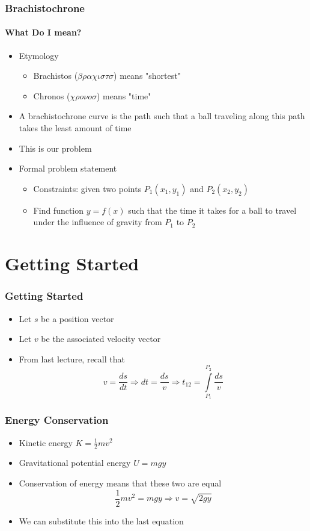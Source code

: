 \documentclass[12pt]{beamer}
\begin{document}
\begin{frame}
\frametitle{Brachistochrone}
\framesubtitle{What Do I mean?}
\begin{itemize}
    \item Etymology
        \pause
        \begin{itemize}
            \item Brachistos ($ \beta \rho \alpha \chi \iota \sigma \tau \sigma $) means "shortest"
            \pause
            \item Chronos ($\chi \rho o \nu o \sigma $) means "time"
        \end{itemize}
    \pause
    \item A brachistochrone curve is the path such that a ball traveling along this path takes the least amount of time
    \pause
    \item This is our problem
    \pause
    \item Formal problem statement
    \begin{itemize}
        \pause
        \item Constraints: given two points $P_1 (x_1, y_1)$ and $P_2 (x_2, y_2)$
        \pause
        \item Find function $y = f(x)$ such that the time it takes for a ball to travel under the influence of gravity from $P_1$ to $P_2$
    \end{itemize}
\end{itemize}
\end{frame}

\section{Getting Started}

\begin{frame}
\frametitle{Getting Started}
\begin{itemize}
    \item Let $s$ be a position vector
    \pause
    \item Let $v$ be the associated velocity vector
    \pause
    \item From last lecture, recall that
    $$
    v = \frac{ds}{dt} \Rightarrow dt = \frac{ds}{v} \Rightarrow t_{12} = \int \limits_{P_1}^{P_2} \frac{ds}{v}
    $$
\end{itemize}
\end{frame}

\begin{frame}
\frametitle{Energy Conservation}
\begin{itemize}
    \pause
    \item Kinetic energy $K = \frac{1}{2} mv^2$
    \pause
    \item Gravitational potential energy $U = mgy$
    \pause
    \item Conservation of energy means that these two are equal
    \pause
    $$
    \frac{1}{2} mv^2 = mgy \Rightarrow v = \sqrt{2gy}
    $$
    \pause
    \item We can substitute this into the last equation
\end{itemize}
\end{frame}
\end{document}
